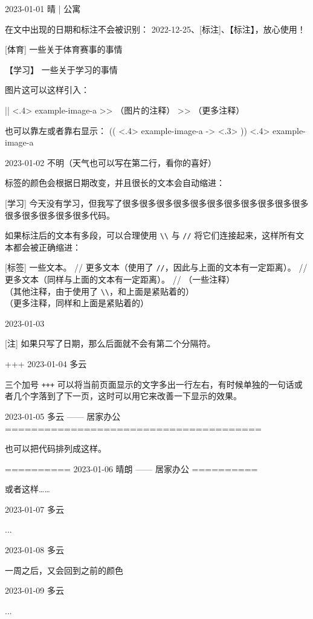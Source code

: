 \documentclass[11pt, paperstyle=light yellow, color entry]{jwjournal}
\begin{document}
2023-01-01 晴 | 公寓

  在文中出现的日期和标注不会被识别： 2022-12-25、[标注]、【标注】，放心使用！

  [体育] 一些关于体育赛事的事情

  【学习】 %
  一些关于学习的事情

  图片这可以这样引入：

  || <.4> {example-image-a} %
  >> （图片的注释）
  >> （更多注释）

  也可以靠左或者靠右显示：
  (( <.4> {example-image-a} %
  -> <.3> %
  )) <.4> {example-image-a} %



2023-01-02
不明（天气也可以写在第二行，看你的喜好）

  标签的颜色会根据日期改变，并且很长的文本会自动缩进：

  [学习] 今天没有学习，但我写了很多很多很多很多很多很多很多很多很多很多很多很多很多很多很多很多代码。

  如果标注后的文本有多段，可以合理使用 \texttt{\textbackslash\textbackslash} 与 \texttt{\slash\slash} 将它们连接起来，这样所有文本都会被正确缩进：

  [标签] 一些文本。
    //
    更多文本（使用了 \texttt{\slash\slash}，因此与上面的文本有一定距离）。
    //
    更多文本（同样与上面的文本有一定距离）。
    //
    （一些注释）
    \\
    （其他注释，由于使用了 \texttt{\textbackslash\textbackslash}，和上面是紧贴着的）
    \\
    （更多注释，同样和上面是紧贴着的）



2023-01-03

  [注] 如果只写了日期，那么后面就不会有第二个分隔符。


+++
2023-01-04  多云

  三个加号 \texttt{+++} 可以将当前页面显示的文字多出一行左右，有时候单独的一句话或者几个字落到了下一页，这时可以用它来改善一下显示的效果。



2023-01-05    多云        —— 居家办公
=======================================

也可以把代码排列成这样。


==========
2023-01-06    晴朗        —— 居家办公
==========

或者这样……



2023-01-07  多云

  ...



2023-01-08  多云

  一周之后，又会回到之前的颜色



2023-01-09  多云

  ...
\end{document}
